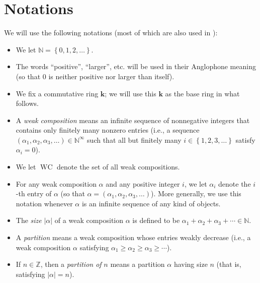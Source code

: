 \documentclass[numbers=enddot,12pt,final,onecolumn,notitlepage]{scrartcl}%
\theoremstyle{definition}
\begin{document}
\section{\label{sect.not}Notations}

We will use the following notations (most of which are also used in
\cite[\S 2.1]{GriRei}):

\begin{itemize}
\item We let $\mathbb{N}=\left\{  0,1,2,\ldots\right\}  $.

\item The words \textquotedblleft positive\textquotedblright,
\textquotedblleft larger\textquotedblright, etc. will be used in their
Anglophone meaning (so that $0$ is neither positive nor larger than itself).

\item We fix a commutative ring $\mathbf{k}$; we will use this $\mathbf{k}$ as
the base ring in what follows.

\item A \emph{weak composition} means an infinite sequence of nonnegative
integers that contains only finitely many nonzero entries (i.e., a sequence
$\left(  \alpha_{1},\alpha_{2},\alpha_{3},\ldots\right)  \in\mathbb{N}%
^{\infty}$ such that all but finitely many $i\in\left\{  1,2,3,\ldots\right\}
$ satisfy $\alpha_{i}=0$).

\item We let $\operatorname*{WC}$ denote the set of all weak compositions.

\item For any weak composition $\alpha$ and any positive integer $i$, we let
$\alpha_{i}$ denote the $i$-th entry of $\alpha$ (so that $\alpha=\left(
\alpha_{1},\alpha_{2},\alpha_{3},\ldots\right)  $). More generally, we use
this notation whenever $\alpha$ is an infinite sequence of any kind of objects.

\item The \emph{size} $\left\vert \alpha\right\vert $ of a weak composition
$\alpha$ is defined to be $\alpha_{1}+\alpha_{2}+\alpha_{3}+\cdots
\in\mathbb{N}$.

\item A \emph{partition} means a weak composition whose entries weakly
decrease (i.e., a weak composition $\alpha$ satisfying $\alpha_{1}\geq
\alpha_{2}\geq\alpha_{3}\geq\cdots$).

\item If $n\in\mathbb{Z}$, then a \emph{partition of} $n$ means a partition
$\alpha$ having size $n$ (that is, satisfying $\left\vert \alpha\right\vert
=n$).


\end{itemize}
\end{document}
